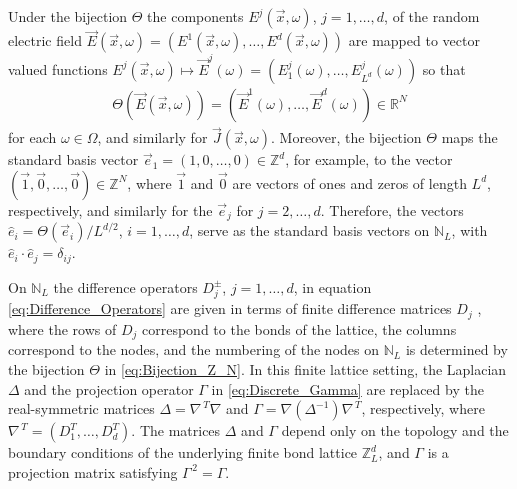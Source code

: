 \documentclass{cmslatex}
\begin{document}
Under the bijection $\Theta$ the components
$E^j(\vec{x},\omega)$, $j=1,\ldots,d$, of the random electric field
$\vec{E}(\vec{x},\omega)=(E^1(\vec{x},\omega),\ldots ,E^d(\vec{x},\omega))$ are mapped to
vector valued functions $E^j(\vec{x},\omega)\mapsto\vec{E}^j(\omega)=(E^j_1(\omega),\ldots,
E^j_{L^d}(\omega))$ so that
% 
\begin{align}\label{eq:bijection_vector_mapping}
  \Theta(\vec{E}(\vec{x},\omega))=(\vec{E}^1(\omega),\ldots ,\vec{E}^d(\omega))\in\mathbb{R}^N
\end{align}
%
for each $\omega\in\Omega$, and similarly for $\vec{J}(\vec{x},\omega)$. Moreover, the
bijection $\Theta$ maps the standard basis vector
$\vec{e}_1=(1,0,\ldots,0)\in\mathbb{Z}^d$, for example, to the
vector $(\vec{1},\vec{0},\ldots,\vec{0})\in\mathbb{Z}^N$, where
$\vec{1}$ and $\vec{0}$ are vectors of ones and zeros of length
$L^d$, respectively, and similarly for the $\vec{e}_j$ for
$j=2,\ldots,d$. Therefore, the vectors $\hat{e}_i=\Theta(\vec{e}_i)/L^{d/2}$,
$i=1,\ldots,d$, serve as the standard basis vectors on $\mathbb{N}_L$, with
$\hat{e}_i\cdot\hat{e}_j=\delta_{ij}$.


On $\mathbb{N}_L$ the difference operators $D_j^\pm$, $j=1,\ldots,d$, in
equation \eqref{eq:Difference_Operators} are given in terms of finite 
difference matrices $D_j$ \cite{Demmel:1997}, where the rows of $D_j$
correspond to the bonds of the lattice, the columns
correspond to the nodes, and the numbering of the nodes on
$\mathbb{N}_L$ is determined by the bijection $\Theta$ in
\eqref{eq:Bijection_Z_N}. In this finite lattice 
setting, the Laplacian $\Delta$ and the projection operator $\Gamma$ in
\eqref{eq:Discrete_Gamma} are replaced by the real-symmetric matrices
$\Delta=\nabla^{\,T}\nabla$ and $\Gamma=\nabla(\Delta^{-1})\nabla^{\,T}$, respectively, where
$\nabla^{\,T}=(D_1^T,\ldots,D_d^T)$. The matrices $\Delta$ and $\Gamma$ depend only on the
topology and the boundary conditions of the underlying finite bond
lattice $\mathbb{Z}_L^d$, and $\Gamma$ is a projection matrix satisfying
$\Gamma^{\,2}=\Gamma$. 
\end{document}
